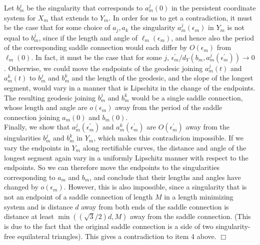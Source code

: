\documentclass[12pt]{article}
\begin{document}
\noindent Let $b_m^j$ be the singularity that corresponds to $a_m^j(0)$ in the persistent coordinate system for $X_m$ that extends to $Y_m$. In order for us to get a contradiction, it must be the case that for some choice of $a_j,a_k$ the singularity $a_m^j(\epsilon_m)$ in $Y_m$ is not equal to $b_m^j$, since if the length and angle of $\ell_m(\epsilon_m)$, and hence also the period of the corresponding saddle connection would each differ by $O(\epsilon_m)$ from $\ell_m(0)$. In fact, it must be the case that for some $j$, $\epsilon_m^\prime/d_Y(b_m,a_m^j(\epsilon_m^\prime)) \to 0$. Otherwise, we could move the endpoints of the geodesic joining $a_m^j(t)$ and $a_m^k(t)$ to $b_m^j$ and $b_m^k$ and the length of the geodesic, and the slope of the longest segment, would vary in a manner that is Lipschitz in the change of the endpoints. The resulting geodesic joining $b_m^j$ and $b_m^k$ would be a single saddle connection, whose length and angle are $o(\epsilon_m)$ away from the period of the saddle connection joining $a_m(0)$ and $b_m(0)$.\\

\noindent Finally, we show that $a_m^j(\epsilon_m^\prime)$ and $a_m^k(\epsilon_m^\prime)$ are $O(\epsilon_m^\prime)$ away from the singularities $b_m^j$ and $b_m^k$ in $Y_m$, which makes this contradicion impossible. If we vary the endpoints in $Y_m$ along rectifiable curves, the distance and angle of the longest segment again vary in a uniformly Lipschitz manner with respect to the endpoints. So we can therefore move the endpoints to the singularities corresponding to $a_m$ and $b_m$, and conclude that their lengths and angles have changed by $o(\epsilon_m)$. However, this is also impossible, since a singularity that is not an endpoint of a saddle connection of length $M$ in a length minimizing system and is distance $d$ away from both ends of the saddle connection is distance at least $\min((\sqrt{3}/2)d,M)$ away from the saddle connection. (This is due to the fact that the original saddle connection is a side of two singularity-free equilateral triangles). This gives a contradiction to item 4 above. $\Box$



\end{document}
